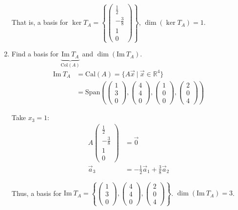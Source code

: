 \documentclass[11pt,fleqn]{book} %
\begin{document}
\begin{example}
\begin{enumerate}
        That is, a basis for $\ker T_A = \left\{ \begin{pmatrix} \frac12 \\ -\frac38 \\ 1 \\ 0 \end{pmatrix} \right\}$, $\dim\left( \ker T_A \right)=1$. 
        
        \item Find a basis for $\underbrace{\mathrm{Im}~T_A}_{\mathrm{Col}(A)}$ and $\dim \left( \mathrm{Im}~T_A \right)$. 
        \begin{align*}
            \mathrm{Im}~T_A 
            &= \mathrm{Cal}(A) = \{ A\vec{x} ~|~ \vec{x} \in \mathbb{R}^4 \}
            \\
            &=\mathrm{Span}\left( \begin{pmatrix} 1\\3\\0 \end{pmatrix}, \begin{pmatrix} 4\\4\\0 \end{pmatrix}, \begin{pmatrix} 1\\0\\0 \end{pmatrix}, \begin{pmatrix} 2\\0\\4 \end{pmatrix} \right)
        \end{align*}
        
        Take $x_3=1$: 
        \begin{align*}
            A \begin{pmatrix} \frac12\\-\frac38\\1\\0 \end{pmatrix}
            &=\vec{0}
            \\
            \vec{a}_3 
            &= -\frac12\vec{a}_1 + \frac38\vec{a}_2
        \end{align*}
        
        Thus, a basis for $\mathrm{Im}~T_A = \left\{ \begin{pmatrix} 1\\3\\0 \end{pmatrix}, \begin{pmatrix} 4\\4\\0 \end{pmatrix}, \begin{pmatrix} 2\\0\\4 \end{pmatrix} \right\}$. $\dim\left( \mathrm{Im}~T_A \right) = 3$. 


\end{enumerate}
\end{example}
\end{document}
